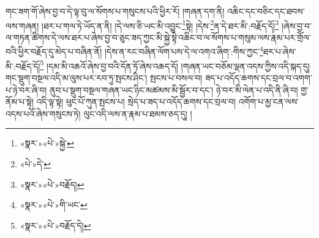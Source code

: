 གང་ཟག་གོ་ཞེས་བྱ་བ་དེ་ལྟ་བུ་ལ་སོགས་པ་གསུངས་པའི་ཕྱིར་རོ། །གཞན་དག་ནི། འཆིང་དང་བཅིང་དང་ཐབས་ལས་གཞན། །ཐར་པ་གལ་ཏེ་ཡོད་ན་ནི། །དེ་ལས་ཅི་ཡང་མི་འབྱུང་\footnote{«སྣར་»«པེ་»སྐྱེ་}སྟེ། །དེས་\footnote{«པེ་»དེ་}ན་དེ་ཐར་མི་:བརྗོད་དོ།\footnote{«སྣར་»«པེ་»བརྗོད།} །ཞེས་བྱ་བ་ལ་གཏན་ཚིགས་དེ་ལས་ཐར་པ་ཞེས་བྱ་བ་ཅུང་ཟད་ཀྱང་མི་སྐྱེ་སྟེ་འཆིང་བ་ལ་སོགས་པ་གསུམ་ལས་རྣམ་པར་གྲོལ་བའི་ཕྱིར་བརྗོད་དུ་མེད་པ་བཞིན་ནོ། །དེས་ན་རང་བཞིན་ལོག་པས་དེ་ལ་འགའ་ཞིག་:གིས་ཀྱང་\footnote{«སྣར་»«པེ་»གི་ཡང་}ཐར་པ་ཞེས་མི་:བརྗོད་དོ།\footnote{«སྣར་»«པེ་»བརྗོད་དེ།} །དམ་མི་འཆའོ་ཞེས་བྱ་བའི་དོན་ཏོ་ཞེས་འཆད་དོ། །གཞན་ཡང་བཅོམ་ལྡན་འདས་ཀྱིས་འདི་སྐད་དུ། གང་སྡུག་བསྔལ་འདི་མ་ལུས་པར་རབ་ཏུ་སྤངས་ཤིང་། སྤངས་པ་བསལ་བ། ཟད་པ་འདོད་ཆགས་དང་བྲལ་བ་འགག་པ་ཉེ་བར་ཞི་བ། ནུབ་པ་སྡུག་བསྔལ་གཞན་ཡང་ཉིང་མཚམས་མི་སྦྱོར་བ་དང་། ཉེ་བར་མི་ལེན་པ་འདི་ནི་ཞི་བ། གྱ་ནོམ་པ་སྟེ། འདི་ལྟ་སྟེ། ཕུང་པོ་ཀུན་སྤངས་པ། སྲེད་པ་ཟད་པ་འདོད་ཆགས་དང་བྲལ་བ། འགོག་པ་མྱ་ངན་ལས་འདས་པའོ་ཞེས་གསུངས་ཏེ། ལུང་འདི་ལས་ན་རྣམ་པ་ཐམས་ཅད་དུ། །

